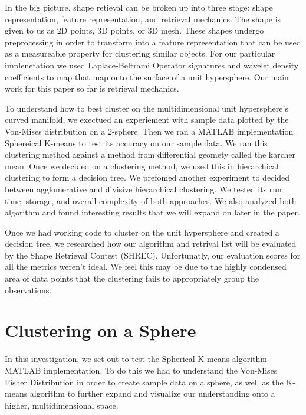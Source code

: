 \documentclass{article}
\begin{document}
In the big picture, shape retieval can be broken up into three stage:
shape representation, feature representation, and retrieval mechanics. The shape is given to us as 2D points, 3D points, or 3D mesh. These shapes undergo preprocessing in order to transform into a feature representation that can be used as a measureable property for clustering similar objects. For our particular implenetation we used Laplace-Beltrami Operator signatures and wavelet density coefficients to map that map onto the surface of a unit hypersphere. Our main work for this paper so far is retrieval mechanics.

To understand how to best cluster on the multidimensional unit hypersphere's curved manifold, we exectued an experiement with sample data plotted by the Von-Mises distribution on a 2-sphere. Then we ran a MATLAB implementation Sphereical K-means to test its accuracy on our sample data. We ran this clustering method against a method from differential geomety called the karcher mean. Once we decided on a clustering method, we used this in hierarchical clustering to form a decision tree. We prefomed another experiment to decided between agglomerative and divisive hierarchical clustering. We tested its run time, storage, and overall complexity of both approaches. We also analyzed both algorithm and found interesting results that we will expand on later in the paper.

Once we had working code to cluster on the unit hypersphere and
created a decision tree, we researched how our algorithm and retrival list will be evaluated by the Shape Retrieval Contest (SHREC). Unfortunatly, our evaluation scores for all the metrics weren't ideal. We feel this may be due to the highly condensed area of data points that the clustering fails to appropriately group the observations.

\part*{Clustering on a Sphere}
In this investigation, we set out to test the Spherical K-means algorithm MATLAB implementation. To do this we had to understand the Von-Mises Fisher Distribution in order to create sample data on a sphere, as well as the K-means algorithm to further expand and visualize our understanding onto a higher, multidimensional space.







\newpage


\end{document}
